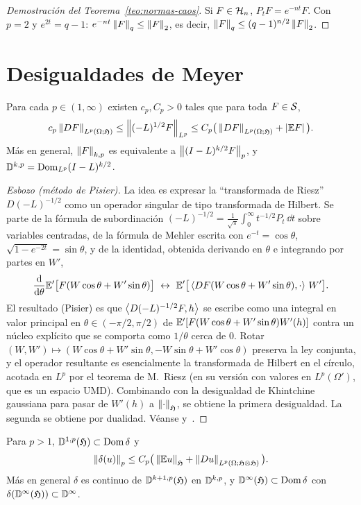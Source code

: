 \begin{proof}[Demostración del Teorema~\ref{teo:normas-caos}]
Si $F\in\mathcal{H}_n$, $P_tF=e^{-nt}F$. Con $p=2$ y $e^{2t}=q-1$:
$e^{-nt}\left\lVert F\right\rVert_q\le\left\lVert F\right\rVert_2$, es decir, $\left\lVert F\right\rVert_q\le(q-1)^{n/2}\left\lVert F\right\rVert_2$.
\end{proof}

\section{Desigualdades de Meyer}

\begin{teorema}[Meyer, 1984]\label{teo:meyer}
Para cada $p\in(1,\infty)$ existen $c_p,C_p>0$ tales que para toda
$F\in\mathcal{S}$,
\[
  c_p\left\lVert DF\right\rVert_{L^p(\Omega;\mathfrak{H})}\le\left\lVert (-L)^{1/2}F\right\rVert_{L^p}\le C_p\big(\left\lVert DF\right\rVert_{L^p(\Omega;\mathfrak{H})}+\left\lvert \mathbb{E} F\right\rvert\big).
\]
Más en general, $\left\lVert F\right\rVert_{k,p}$ es equivalente a $\left\lVert (I-L)^{k/2}F\right\rVert_p$, y $\mathbb{D}^{k,p}=\operatorname{Dom}_{L^p}(I-L)^{k/2}$.
\end{teorema}

\begin{proof}[Esbozo (método de Pisier)]
La idea es expresar la ``transformada de Riesz'' $D(-L)^{-1/2}$ como
un operador singular de tipo transformada de Hilbert. Se parte de la fórmula de subordinación
$(-L)^{-1/2}=\frac1{\sqrt\pi}\int_0^\infty t^{-1/2}P_t\,\dd t$ sobre variables centradas, de la fórmula de Mehler escrita con
$e^{-t}=\cos\theta$, $\sqrt{1-e^{-2t}}=\sin\theta$, y de la identidad, obtenida derivando en $\theta$ e integrando por
partes en $W'$,
\[
  \frac{\dd}{\dd\theta}\E'\big[F(W\cos\theta+W'\sin\theta)\big]\ \leftrightarrow\ \E'\big[\ip{DF(W\cos\theta+W'\sin\theta)}{\cdot}\,W'\big].
\]
El resultado (Pisier) es que $\left\langle D(-L)^{-1/2}F, h\right\rangle$ se escribe como una integral en valor principal en
$\theta\in(-\pi/2,\pi/2)$ de $\mathbb{E}'[F(W\cos\theta+W'\sin\theta)W'(h)]$ contra un núcleo explícito que se comporta
como $1/\theta$ cerca de 0. Rotar $(W,W')\mapsto(W\cos\theta+W'\sin\theta,-W\sin\theta+W'\cos\theta)$ preserva la ley
conjunta, y el operador resultante es esencialmente la transformada de Hilbert en el círculo,
acotada en $L^p$ por el teorema de M.~Riesz (en su versión con valores en $L^p(\Omega')$, que es un
espacio UMD). Combinando con la desigualdad de Khintchine gaussiana para pasar de $W'(h)$ a
$\left\lVert \cdot\right\rVert_{\mathfrak{H}}$, se obtiene la primera desigualdad. La segunda se obtiene por dualidad. Véanse \cite[§1.5]{Nualart06}
y~\cite{Pisier88}.
\end{proof}

\begin{corolario}\label{cor:continuidad-delta}
Para $p>1$, $\mathbb{D}^{1,p}(\mathfrak{H})\subset\operatorname{Dom}\delta$ y
\[
  \left\lVert \delta(u)\right\rVert_p\le C_p\big(\left\lVert \mathbb{E} u\right\rVert_{\mathfrak{H}}+\left\lVert Du\right\rVert_{L^p(\Omega;\mathfrak{H}\otimes\mathfrak{H})}\big).
\]
Más en general $\delta$ es continuo de $\mathbb{D}^{k+1,p}(\mathfrak{H})$ en $\mathbb{D}^{k,p}$, y $\mathbb{D}^\infty(\mathfrak{H})\subset\operatorname{Dom}\delta$ con $\delta(\mathbb{D}^\infty(\mathfrak{H}))\subset\mathbb{D}^\infty$.
\end{corolario}

